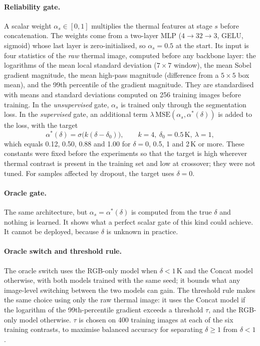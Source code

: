 \documentclass[runningheads]{llncs}
\begin{document}
\paragraph{Reliability gate.} A scalar weight $\alpha_s\in[0,1]$ multiplies the thermal features at stage $s$ before concatenation. The weights come from a two-layer MLP ($4\rightarrow32\rightarrow3$, GELU, sigmoid) whose last layer is zero-initialised, so $\alpha_s=0.5$ at the start. Its input is four statistics of the \emph{raw} thermal image, computed before any backbone layer: the logarithms of the mean local standard deviation ($7\times7$ window), the mean Sobel gradient magnitude, the mean high-pass magnitude (difference from a $5\times5$ box mean), and the 99th percentile of the gradient magnitude. They are standardised with means and standard deviations computed on 256 training images before training. In the \emph{unsupervised} gate, $\alpha_s$ is trained only through the segmentation loss. In the \emph{supervised} gate, an additional term $\lambda\,\mathrm{MSE}(\alpha_s,\alpha^{*}(\delta))$ is added to the loss, with the target
\begin{equation}
\alpha^{*}(\delta)=\sigma\bigl(k(\delta-\delta_0)\bigr),\qquad k=4,\ \delta_0=0.5\,\mathrm{K},\ \lambda=1,
\end{equation}
which equals 0.12, 0.50, 0.88 and 1.00 for $\delta=0$, 0.5, 1 and 2\,K or more. These constants were fixed before the experiments so that the target is high wherever thermal contrast is present in the training set and low at crossover; they were not tuned. For samples affected by dropout, the target uses $\delta=0$.

\paragraph{Oracle gate.} The same architecture, but $\alpha_s=\alpha^{*}(\delta)$ is computed from the true $\delta$ and nothing is learned. It shows what a perfect scalar gate of this kind could achieve. It cannot be deployed, because $\delta$ is unknown in practice.

\paragraph{Oracle switch and threshold rule.} The oracle switch uses the RGB-only model when $\delta<1$\,K and the Concat model otherwise, with both models trained with the same seed; it bounds what any image-level switching between the two models can gain. The threshold rule makes the same choice using only the raw thermal image: it uses the Concat model if the logarithm of the 99th-percentile gradient exceeds a threshold $\tau$, and the RGB-only model otherwise. $\tau$ is chosen on 400 training images at each of the six training contrasts, to maximise balanced accuracy for separating $\delta\geq1$ from $\delta<1$.
\end{document}
